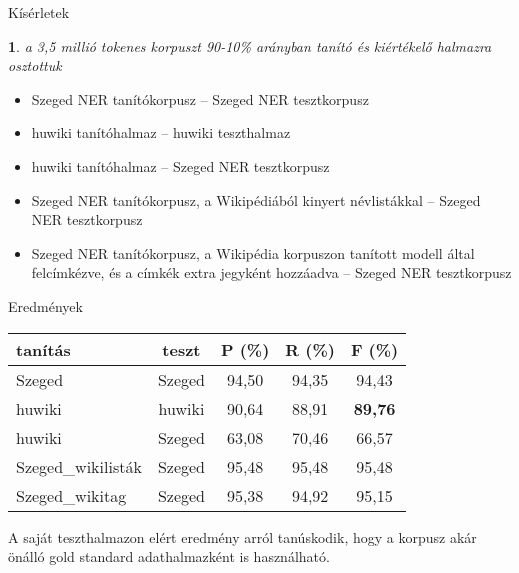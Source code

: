 \documentclass[utf8x,t]{beamer}
\newtheorem{nix}{}[section]
\begin{document}
\begin{frame}{Kísérletek}

\begin{nix}
a 3,5 millió tokenes korpuszt 90-10\% arányban tanító és kiértékelő halmazra osztottuk
\end{nix}

\bigskip

\begin{itemize}
\item Szeged NER tanítókorpusz -- Szeged NER tesztkorpusz
\item huwiki tanítóhalmaz -- huwiki teszthalmaz
\item huwiki tanítóhalmaz -- Szeged NER tesztkorpusz
\item Szeged NER tanítókorpusz, a Wikipédiából kinyert névlistákkal -- Szeged NER tesztkorpusz
\item Szeged NER tanítókorpusz, a Wikipédia korpuszon tanított modell által felcímkézve, és a címkék extra jegyként hozzáadva -- Szeged NER tesztkorpusz
\end{itemize}

\end{frame}

\begin{frame}{Eredmények}

\begin{center}
\begin{tabular}{lcccc}
\toprule 
\bf tanítás & \bf teszt & \bf P (\%) & \bf R (\%) & \bf F (\%) \\ 
\midrule
Szeged & Szeged & 94,50 & 94,35 & 94,43 \\
huwiki & huwiki & 90,64 & 88,91 &  \textbf{89,76}  \\
huwiki & Szeged & 63,08 & 70,46 & 66,57  \\
Szeged\_wikilisták & Szeged & 95,48 & 95,48 & 95,48  \\
Szeged\_wikitag & Szeged & 95,38 & 94,92 & 95,15 \\
\bottomrule
\end{tabular}
\end{center}

\bigskip

A saját teszthalmazon elért eredmény arról tanúskodik, hogy a korpusz akár önálló gold standard adathalmazként is használható.

\end{frame}

\end{document}
